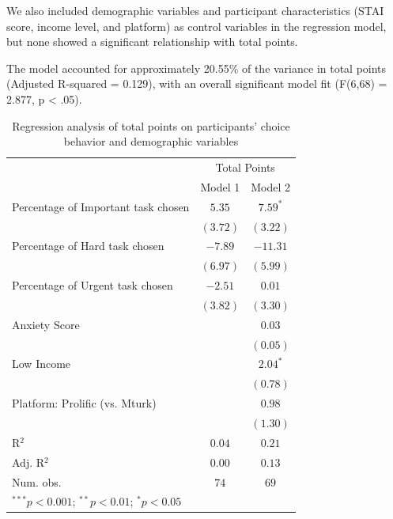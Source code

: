 \documentclass[
]{report}
\begin{document}
We also included demographic variables and participant characteristics
(STAI score, income level, and platform) as control variables in the
regression model, but none showed a significant relationship with total
points.

The model accounted for approximately 20.55\% of the variance in total
points (Adjusted R-squared = 0.129), with an overall significant model
fit (F(6,68) = 2.877, p \textless{} .05).

\begin{table}

\caption{\label{tbl-totalpoints}Regression analysis of total points on
participants' choice behavior and demographic
variables}\begin{minipage}[t]{\linewidth}

{\centering 

\begin{center}
\begin{tabular}{l c c}
\hline
 & \multicolumn{2}{c}{Total Points} \\
\cline{2-3}
 & Model 1 & Model 2 \\
\hline
Percentage of Important task chosen & $5.35$   & $7.59^{*}$ \\
                                    & $(3.72)$ & $(3.22)$   \\
Percentage of Hard task chosen      & $-7.89$  & $-11.31$   \\
                                    & $(6.97)$ & $(5.99)$   \\
Percentage of Urgent task chosen    & $-2.51$  & $0.01$     \\
                                    & $(3.82)$ & $(3.30)$   \\
Anxiety Score                       &          & $0.03$     \\
                                    &          & $(0.05)$   \\
Low Income                          &          & $2.04^{*}$ \\
                                    &          & $(0.78)$   \\
Platform: Prolific (vs. Mturk)      &          & $0.98$     \\
                                    &          & $(1.30)$   \\
\hline
R$^2$                               & $0.04$   & $0.21$     \\
Adj. R$^2$                          & $0.00$   & $0.13$     \\
Num. obs.                           & $74$     & $69$       \\
\hline
\multicolumn{3}{l}{\scriptsize{$^{***}p<0.001$; $^{**}p<0.01$; $^{*}p<0.05$}}
\end{tabular}


\end{center}}
\end{minipage}
\end{table}
\end{document}
